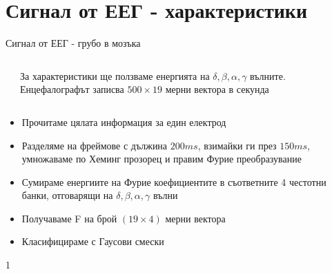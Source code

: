 \documentclass[9pt]{beamer}
\begin{document}
    \section{Сигнал от ЕЕГ - характеристики}
    \begin{frame}[t]{Сигнал от ЕЕГ - грубо в мозъка}
        \begin{columns}
            \begin{column}{0.48\textwidth}
            \end{column}
            \begin{column}{0.48\textwidth}
                \pause
                За характеристики ще ползваме енергията на  $\delta, \beta, \alpha, \gamma$ вълните.
                \pause
                Енцефалографът записва $500\times19$ мерни вектора в секунда
            \end{column}
        \end{columns}
        \begin{itemize}
            \setlength\itemsep{\fill}
            \pause
            \item Прочитаме цялата информация за един електрод
            \pause
            \item Разделяме на фреймове с дължина $200ms$, взимайки ги през $150ms$, умножаваме по Хеминг прозорец и правим Фурие преобразувание
            \pause
            \item Сумираме енергиите на Фурие коефициентите в съответните 4 честотни банки, отговарящи на $\delta, \beta, \alpha, \gamma$ вълни
            \pause
            \item Получаваме F на брой $(19\times 4)$ мерни вектора
            \pause
            \item Класифицираме с Гаусови смески
        \end{itemize}
    \end{frame}
    1
\end{document}
